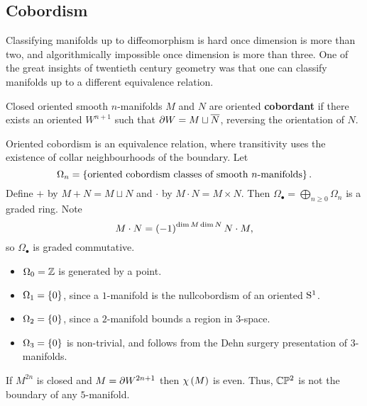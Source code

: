 \pagebreak

\subsection{Cobordism}


Classifying manifolds up to diffeomorphism is hard once dimension is more than two, and algorithmically impossible once dimension is more than three. One of the great insights of twentieth century geometry was that one can classify manifolds up to a different equivalence relation.

\begin{definition*}
Closed oriented smooth $ n $-manifolds $ M $ and $ N $ are oriented \textbf{cobordant} if there exists an oriented $ W^{n + 1} $ such that $ \da W = M \sqcup \overline{N} $, reversing the orientation of $ N $.
\end{definition*}

Oriented cobordism is an equivalence relation, where transitivity uses the existence of collar neighbourhoods of the boundary. Let
$$ \Omega_n = \cbr{\text{oriented cobordism classes of smooth $ n $-manifolds}}. $$
Define $ + $ by $ M + N = M \sqcup N $ and $ \cdot $ by $ M \cdot N = M \times N $. Then $ \Omega_\bullet = \bigoplus_{n \ge 0} \Omega_n $ is a graded ring. Note
$$ M \cdot N = \br{-1}^{\dim M\dim N}N \cdot M, $$
so $ \Omega_\bullet $ is graded commutative.

\begin{example*}
\hfill
\begin{itemize}
\item $ \Omega_0 = \ZZ $ is generated by a point.
\item $ \Omega_1 = \cbr{0} $, since a $ 1 $-manifold is the nullcobordism of an oriented $ \S^1 $.
\item $ \Omega_2 = \cbr{0} $, since a $ 2 $-manifold bounds a region in $ 3 $-space.
\item $ \Omega_3 = \cbr{0} $ is non-trivial, and follows from the Dehn surgery presentation of $ 3 $-manifolds.
\end{itemize}
\end{example*}

\begin{lemma}
If $ M^{2n} $ is closed and $ M = \da W^{2n + 1} $ then $ \chi\br{M} $ is even. Thus, $ \CC\PP^2 $ is not the boundary of any $ 5 $-manifold.
\end{lemma}

